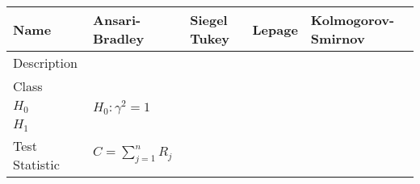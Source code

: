 \documentclass[10pt,a4paper]{article}
\begin{document}
\begin{table}[]
    \begin{tabular}{|l|l|l|l|l|}
        \hline
        Name               & Ansari-Bradley                                                                                                                                                                                                                                                                                                                   & Siegel Tukey & Lepage & Kolmogorov-Smirnov \\ \hline
        Description        &                                                                                                                                                                                                                                                                                                                                  &              &        &                    \\ \hline
        Class              &                                                                                                                                                                                                                                                                                                                                  &              &        &                    \\ \hline
        $H_0$              & $H_{0} : \gamma^{2}=1$                                                                                                                                                                                                                                                                                                           &              &        &                    \\ \hline
        $H_1$              &                                                                                                                                                                                                                                                                                                                                  &              &        &                    \\ \hline
        Test Statistic     & $C=\sum_{j=1}^{n} R_{j}$                                                                                                                                                                                                                                                                                                         &              &        &                    \\ \hline

\end{tabular}
\end{table}
\end{document}
